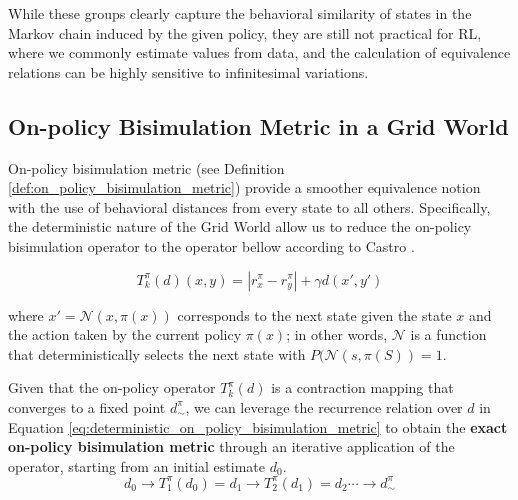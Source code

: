 
While these groups clearly capture the behavioral similarity of states in the Markov chain induced by the given policy, they are still not practical for RL, where we commonly estimate values from data, and the calculation of equivalence relations can be highly sensitive to infinitesimal variations. 

\subsection{On-policy Bisimulation Metric in a Grid World}

On-policy bisimulation metric (see Definition \ref{def:on_policy_bisimulation_metric}) provide a smoother equivalence notion with the use of behavioral distances from every state to all others. Specifically, the deterministic nature of the Grid World allow us to reduce the on-policy bisimulation operator to the operator bellow according to Castro \cite{castro2020scalable}.

\begin{equation}
    \label{eq:deterministic_on_policy_bisimulation_metric}
    T^\pi_k(d)(x, y) = |r^\pi_x - r^\pi_{y}| + \gamma d(x',y') 
\end{equation}

where $x' = \mathcal{N}(x,\pi(x))$ corresponds to the next state given the state $x$ and the action taken by the current policy $\pi(x)$; in other words, $\mathcal{N}$ is a function that deterministically selects the next state with $P(\mathcal{N}(s,\pi(S)) = 1$.

Given that the on-policy operator $T^\pi_k(d)$ is a contraction mapping that converges to a fixed point \(d^\pi_\sim\), we can leverage the recurrence relation over \(d\) in Equation \ref{eq:deterministic_on_policy_bisimulation_metric} to obtain the \textbf{exact on-policy bisimulation metric} through an iterative application of the operator, starting from an initial estimate \(d_0\).
$$d_0 \rightarrow T^\pi_1(d_0) = d_1 \rightarrow T^\pi_2(d_1) = d_2 \cdots \rightarrow d^\pi_\sim$$

